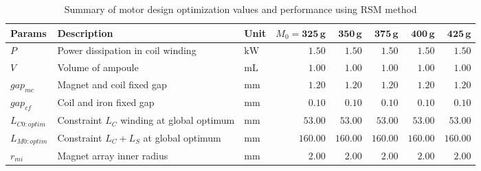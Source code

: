             
            \begin{landscape}
                \begin{table}
                    \renewcommand{\arraystretch}{1.2}
                    \caption{Summary of motor design optimization values and performance using \acs{RSM} method}
                    \label{table:result for global optimization of PMLSM via RSM method}
                    \centering
                    \begin{tabular}{lllrrrrr}
                        \hline
                        \textbf{Params}     & \textbf{Description}                            & \textbf{Unit}           & $M_0=\mathbf{325\,g}$ & $\mathbf{350\,g}$ & $\mathbf{375\,g}$ & $\mathbf{400\,g}$ & $\mathbf{425\,g}$ \\
                        \hline
                        $P$        & Power dissipation in coil winding      & $\mathrm{kW}$  & $1.50$                & $1.50$            & $1.50$            & $1.50$            & $1.50$            \\
                        $V$        & Volume of ampoule                      & $\mathrm{mL}$  & $1.00$                & $1.00$            & $1.00$            & $1.00$            & $1.00$            \\
                        $gap_{mc}$ & Magnet and coil fixed gap              & $\mathrm{mm}$  & $1.20$                & $1.20$            & $1.20$            & $1.20$            & $1.20$            \\
                        $gap_{cf}$ & Coil and iron fixed gap                & $\mathrm{mm}$  & $0.10$                & $0.10$            & $0.10$            & $0.10$            & $0.10$            \\
                        \hline
                        $L_{C0:optim}$ & Constraint $L_C$ winding at global optimum & $\mathrm{mm}$        & $53.00$                       & $53.00$           & $53.00$           & $53.00$           & $53.00$           \\
                        $L_{M0:optim}$ & Constraint $L_C+L_S$ at global optimum        & $\mathrm{mm}$        & $160.00$                      & $160.00$          & $160.00$          & $160.00$          & $160.00$          \\
                        \hline
                        $r_{mi}$   & Magnet array inner radius              & $\mathrm{mm}$  & $2.00$                & $2.00$            & $2.00$            & $2.00$            & $2.00$            \\

\end{tabular}
\end{table}
\end{landscape}
